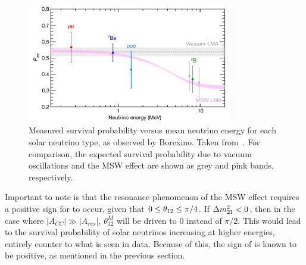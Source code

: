 \begin{figure}
    \centering
    \includegraphics[width=0.8\textwidth]{1_NeutrinoTheory/Figs/borexino_pee_energy_plot.png}
    \caption[Measured survival probability versus mean neutrino energy for each solar neutrino type, as observed by Borexino]{Measured survival probability versus mean neutrino energy for each solar neutrino type, as observed by Borexino. Taken from~\cite{agostiniComprehensiveMeasurementPpchain2018}. For comparison, the expected survival probability due to vacuum oscillations and the MSW effect are shown as grey and pink bands, respectively.}
    \label{fig:pee_solar_data}
\end{figure}

Important to note is that the resonance phenomenon of the MSW effect requires a positive sign for \dmsq{} to occur, given that $0\leq\theta_{12}{}\leq\pi/4$. If $\Delta m^{2}_{21}{}<0$, then in the case where $|A_{CC}|\gg |A_{res}|$, $\theta_{12}^{M}$ will be driven to 0 instead of $\pi/2$. This would lead to the survival probability of solar neutrinos increasing at higher energies, entirely counter to what is seen in data. Because of this, the sign of \dmsq{} is known to be positive, as mentioned in the previous section.


